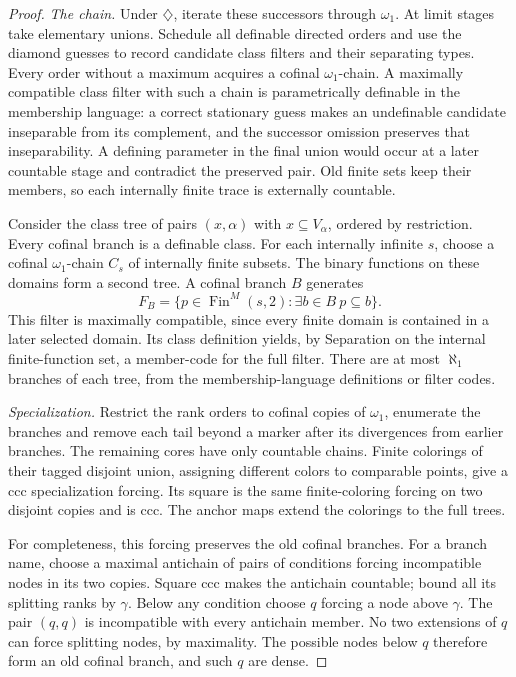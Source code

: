 \documentclass[11pt,a4paper]{amsart}
\begin{document}
\begin{proof}
\emph{The chain.} Under $\diamondsuit$, iterate these successors through $\omega_1$. At limit stages take elementary unions. Schedule all definable directed orders and use the diamond guesses to record candidate class filters and their separating types. Every order without a maximum acquires a cofinal $\omega_1$-chain. A maximally compatible class filter with such a chain is parametrically definable in the membership language: a correct stationary guess makes an undefinable candidate inseparable from its complement, and the successor omission preserves that inseparability. A defining parameter in the final union would occur at a later countable stage and contradict the preserved pair. Old finite sets keep their members, so each internally finite trace is externally countable.

Consider the class tree of pairs $(x,\alpha)$ with $x\subseteq V_\alpha$, ordered by restriction. Every cofinal branch is a definable class. For each internally infinite $s$, choose a cofinal $\omega_1$-chain $C_s$ of internally finite subsets. The binary functions on these domains form a second tree. A cofinal branch $B$ generates
\[
F_B=\{p\in\operatorname{Fin}^M(s,2):\exists b\in B\ p\subseteq b\}.
\]
This filter is maximally compatible, since every finite domain is contained in a later selected domain. Its class definition yields, by Separation on the internal finite-function set, a member-code for the full filter. There are at most $\aleph_1$ branches of each tree, from the membership-language definitions or filter codes.

\emph{Specialization.} Restrict the rank orders to cofinal copies of $\omega_1$, enumerate the branches and remove each tail beyond a marker after its divergences from earlier branches. The remaining cores have only countable chains. Finite colorings of their tagged disjoint union, assigning different colors to comparable points, give a ccc specialization forcing. Its square is the same finite-coloring forcing on two disjoint copies and is ccc. The anchor maps extend the colorings to the full trees.

For completeness, this forcing preserves the old cofinal branches. For a branch name, choose a maximal antichain of pairs of conditions forcing incompatible nodes in its two copies. Square ccc makes the antichain countable; bound all its splitting ranks by $\gamma$. Below any condition choose $q$ forcing a node above $\gamma$. The pair $(q,q)$ is incompatible with every antichain member. No two extensions of $q$ can force splitting nodes, by maximality. The possible nodes below $q$ therefore form an old cofinal branch, and such $q$ are dense.


\end{proof}
\end{document}
